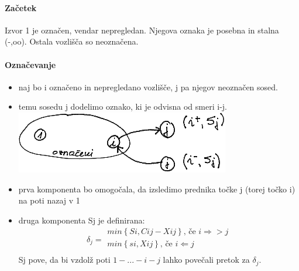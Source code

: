 \documentclass[a4paper,10pt]{article}
\begin{document}
\paragraph{Za\v cetek}
Izvor 1 je ozna\v cen, vendar nepregledan. Njegova oznaka je posebna in stalna (-,oo). Ostala vozli\v s\v ca so neozna\v cena.

\paragraph{Ozna\v cevanje}
\begin{itemize}
\item naj bo i ozna\v ceno in nepregledano vozli\v s\v ce, j pa njegov neozna\v cen sosed.
\item temu sosedu j dodelimo oznako, ki je odvisna od smeri i-j.\\
	\includegraphics{Slike/MaxPretokOznacevanje1.png}\\
\item prva komponenta bo omogo\v cala, da izsledimo prednika to\v cke j (torej to\v cko i) na poti nazaj v 1
\item druga komponenta Sj je definirana:
	$$
	\delta_j = 
	\begin{array}{ll}
	min \left\lbrace  Si, Cij-Xij \right\rbrace  \mbox{, \v ce } i \Rightarrow >j\\
	min \left\lbrace  si, Xij \right\rbrace  \mbox{, \v ce } i \Leftarrow j\\
	\end{array}
	$$	
	Sj pove, da bi vzdol\v z poti $1-...-i-j$ lahko pove\v cali pretok za $\delta_j$.
\end{itemize}
\end{document}
